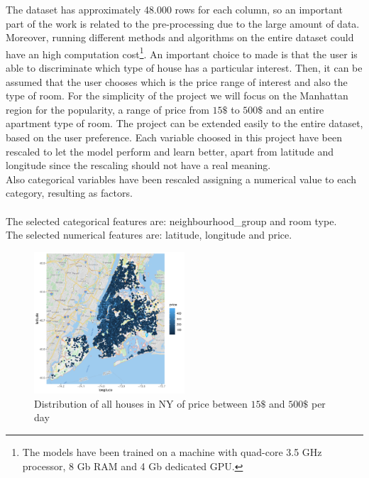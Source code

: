 \documentclass{FR16}
\begin{document}
The dataset has approximately 48.000 rows for each column, so an important part of the work is related to the pre-processing due to the large amount of data. Moreover, running different methods and algorithms on the entire dataset could have an high computation cost\footnote{ The models have been trained on a machine with quad-core 3.5 GHz processor, 8 Gb RAM and 4 Gb dedicated GPU.}. An important choice to made is that the user is able to discriminate which type of house has a particular interest. Then, it can be assumed that the user chooses which is the price range of interest and also the type of room. For the simplicity of the project we will focus on the Manhattan region for the popularity, a range of price from $15\$$ to $500\$$ and an entire apartment type of room. The project can be extended easily to the entire dataset, based on the user preference. 
Each variable choosed in this project have been rescaled to let the model perform and learn better, apart from latitude and longitude since the rescaling should not have a real meaning.
\\ Also categorical variables have been rescaled assigning a numerical value to each category, resulting as factors. \\\\
The selected categorical features are: neighbourhood\_group and room type.\\
The selected numerical features are: latitude, longitude and price.
\begin{figure}[H]
\centering
\includegraphics[width=0.5\textwidth]{figures/figure3.pdf} 
\caption{\label{fig:3} Distribution of all houses in NY of price between $15\$$ and $500\$$ per day}
\end{figure}
\end{document}
